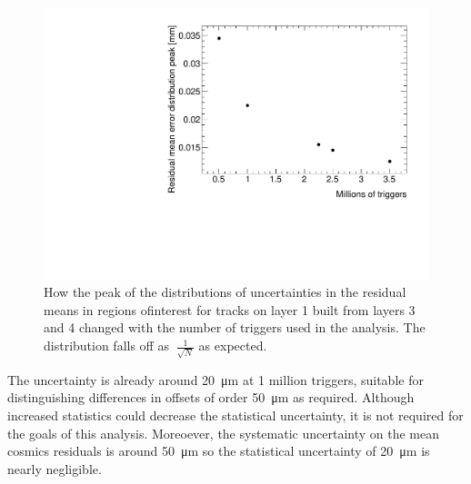 \begin{figure}
    \centering
    \includegraphics[width = \textwidth]{figures/figure_QS3P18_2900V_peakOfMeanErrorsDistVsTriggers_layer1_fixedlayers34.pdf}
    \caption{How the peak of the distributions of uncertainties in the residual means in regions ofinterest for tracks on layer 1 built from layers 3 and 4 changed with the number of triggers used in the analysis. The distribution falls off as $~\frac{1}{\sqrt{N}}$ as expected.}
    \label{fig:res_mean_uncert_vs_triggers}
\end{figure}

The uncertainty is already around \SI{20}{\micro\meter} at 1 million triggers, suitable for distinguishing differences in offsets of order \SI{50}{\micro\meter} as required. Although increased statistics could decrease the statistical uncertainty, it is not required for the goals of this analysis. Moreoever, the systematic uncertainty on the mean cosmics residuals is around \SI{50}{\micro\meter} so the statistical uncertainty of \SI{20}{\micro\meter} is nearly negligible.

